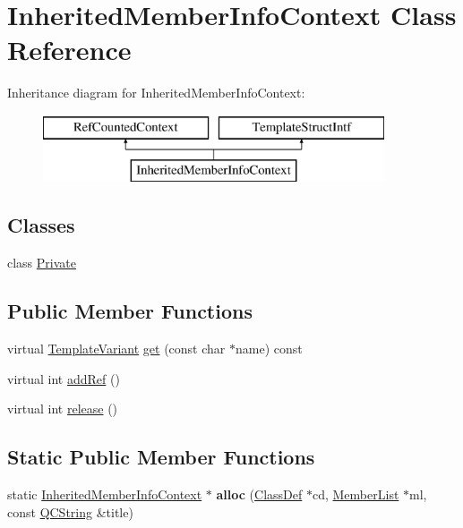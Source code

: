 \hypertarget{class_inherited_member_info_context}{}\section{Inherited\+Member\+Info\+Context Class Reference}
\label{class_inherited_member_info_context}
Inheritance diagram for Inherited\+Member\+Info\+Context\+:\begin{figure}[H]
\begin{center}
\leavevmode
\includegraphics[height=2.000000cm]{class_inherited_member_info_context}
\end{center}
\end{figure}
\subsection*{Classes}
\begin{DoxyCompactItemize}
\item 
class \mbox{\hyperlink{class_inherited_member_info_context_1_1_private}{Private}}
\end{DoxyCompactItemize}
\subsection*{Public Member Functions}
\begin{DoxyCompactItemize}
\item 
virtual \mbox{\hyperlink{class_template_variant}{Template\+Variant}} \mbox{\hyperlink{class_inherited_member_info_context_a6db282829170c4fcca2a8c77eeb9fda5}{get}} (const char $\ast$name) const
\item 
virtual int \mbox{\hyperlink{class_inherited_member_info_context_a38bbd0b70b99adbf488dbf2e72753a51}{add\+Ref}} ()
\item 
virtual int \mbox{\hyperlink{class_inherited_member_info_context_a285fdfc40bae5fb0a66ad5a38781ee05}{release}} ()
\end{DoxyCompactItemize}
\subsection*{Static Public Member Functions}
\begin{DoxyCompactItemize}
\item 
\mbox{\label{class_inherited_member_info_context_af04d4694d03a4fc7b9f92206873a9751}} 
static \mbox{\hyperlink{class_inherited_member_info_context}{Inherited\+Member\+Info\+Context}} $\ast$ {\bfseries alloc} (\mbox{\hyperlink{class_class_def}{Class\+Def}} $\ast$cd, \mbox{\hyperlink{class_member_list}{Member\+List}} $\ast$ml, const \mbox{\hyperlink{class_q_c_string}{Q\+C\+String}} \&title)
\end{DoxyCompactItemize}



